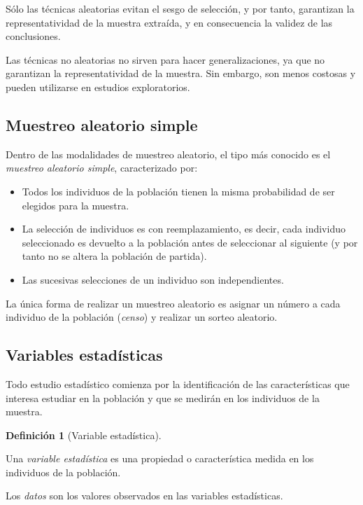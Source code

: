 \documentclass[
  spanish,
  a4paper,
]{scrreport}
\providecommand{\tightlist}{%
  \setlength{\itemsep}{0pt}\setlength{\parskip}{0pt}}
\theoremstyle{plain}
\theoremstyle{definition}
\theoremstyle{definition}
\newtheorem{definition}{Definición}[chapter]
\theoremstyle{remark}
\begin{document}
Sólo las técnicas aleatorias evitan el sesgo de selección, y por tanto,
garantizan la representatividad de la muestra extraída, y en
consecuencia la validez de las conclusiones.

Las técnicas no aleatorias no sirven para hacer generalizaciones, ya que
no garantizan la representatividad de la muestra. Sin embargo, son menos
costosas y pueden utilizarse en estudios exploratorios.

\subsection{Muestreo aleatorio simple}\label{muestreo-aleatorio-simple}

Dentro de las modalidades de muestreo aleatorio, el tipo más conocido es
el \emph{muestreo aleatorio simple}, caracterizado por:

\begin{itemize}
\tightlist
\item
  Todos los individuos de la población tienen la misma probabilidad de
  ser elegidos para la muestra.
\item
  La selección de individuos es con reemplazamiento, es decir, cada
  individuo seleccionado es devuelto a la población antes de seleccionar
  al siguiente (y por tanto no se altera la población de partida).
\item
  Las sucesivas selecciones de un individuo son independientes.
\end{itemize}

La única forma de realizar un muestreo aleatorio es asignar un número a
cada individuo de la población (\emph{censo}) y realizar un sorteo
aleatorio.

\subsection{Variables estadísticas}\label{variables-estaduxedsticas}

Todo estudio estadístico comienza por la identificación de las
características que interesa estudiar en la población y que se medirán
en los individuos de la muestra.

\begin{definition}[Variable
estadística]\protect\hypertarget{def-variable-estadistica}{}\label{def-variable-estadistica}

Una \emph{variable estadística} es una propiedad o característica medida
en los individuos de la población.

Los \emph{datos} son los valores observados en las variables
estadísticas.

\end{definition}
\end{document}
